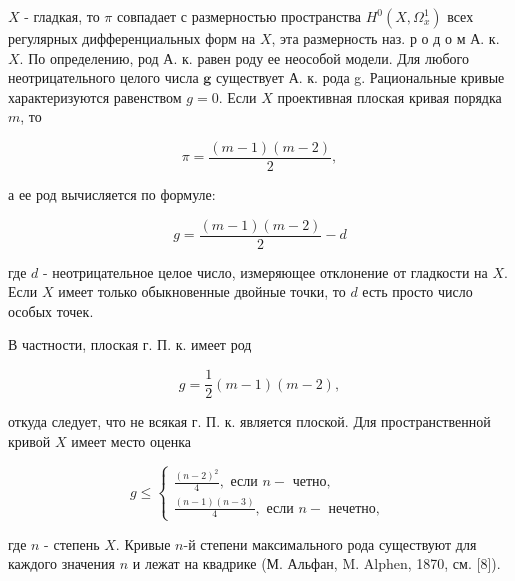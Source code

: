 \documentclass[10pt]{article}
\begin{document}
$X$ - гладкая, то $\pi$ совпадает с размерностью пространства $H^{0}\left(X, \Omega_{x}^{1}\right)$ всех регулярных дифференциальных форм на $X$, эта размерность наз. р о д о м А. к. $X$. По определению, род А. к. равен роду ее неособой модели. Для любого неотрицательного целого числа $\boldsymbol{g}$ существует А. к. рода g. Рациональные кривые характеризуются равенством $g=0$. Если $X$ проективная плоская кривая порядка $m$, то



\[

\pi=\frac{(m-1)(m-2)}{2},

\]



а ее род вычисляется по формуле:



\[

g=\frac{(m-1)(m-2)}{2}-d

\]



где $d$ - неотрицательное целое число, измеряющее отклонение от гладкости на $X$. Если $X$ имеет только обыкновенные двойные точки, то $d$ есть просто число особых точек.



В частности, плоская г. П. к. имеет род



\[

g=\frac{1}{2}(m-1)(m-2),

\]



откуда следует, что не всякая г. П. к. является плоской. Для пространственной кривой $X$ имеет место оценка



\[

g \leqslant\left\{\begin{array}{l}

\frac{(n-2)^{2}}{4}, \text { если } n-\text { четно, } \\

\frac{(n-1)(n-3)}{4}, \text { если } n-\text { нечетно, }

\end{array}\right.

\]



где $n$ - степень $X$. Кривые $n$-й степени максимального рода существуют для каждого значения $n$ и лежат на квадрике (М. Альфан, M. Alphen, 1870, см. [8]).
\end{document}
